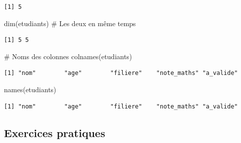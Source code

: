 \documentclass[
  french,
  11pt,
  a4paper,
]{article}
\newenvironment{Shaded}{}{}
\newcommand{\CommentTok}[1]{\textcolor[rgb]{0.42,0.45,0.49}{#1}}
\newcommand{\FunctionTok}[1]{\textcolor[rgb]{0.44,0.26,0.76}{#1}}
\newcommand{\NormalTok}[1]{\textcolor[rgb]{0.14,0.16,0.18}{#1}}
\begin{document}
\begin{verbatim}
[1] 5
\end{verbatim}

\begin{Shaded}
\begin{Highlighting}[]
\FunctionTok{dim}\NormalTok{(etudiants)    }\CommentTok{\# Les deux en même temps}
\end{Highlighting}
\end{Shaded}

\begin{verbatim}
[1] 5 5
\end{verbatim}

\begin{Shaded}
\begin{Highlighting}[]
\CommentTok{\# Noms des colonnes}
\FunctionTok{colnames}\NormalTok{(etudiants)}
\end{Highlighting}
\end{Shaded}

\begin{verbatim}
[1] "nom"        "age"        "filiere"    "note_maths" "a_valide"  
\end{verbatim}

\begin{Shaded}
\begin{Highlighting}[]
\FunctionTok{names}\NormalTok{(etudiants)}
\end{Highlighting}
\end{Shaded}

\begin{verbatim}
[1] "nom"        "age"        "filiere"    "note_maths" "a_valide"  
\end{verbatim}

\subsection{Exercices pratiques}\label{exercices-pratiques}
\end{document}
